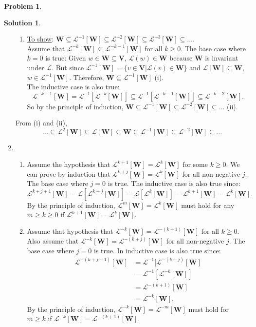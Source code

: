 \documentclass{article}
\theoremstyle{definition}
\newtheorem*{prob*}{Problem}
\newtheorem*{sln*}{Solution}
\newcommand{\V}{\mathbf{V}}
\newcommand{\W}{\mathbf{W}}
\newcommand{\lag}{\mathcal{L}}
\begin{document}
\begin{prob*}
\begin{sln*}
\begin{enumerate}
\begin{enumerate}
				\item \underline{To show}: $\W \subseteq \lag^{-1}[\W] \subseteq \lag^{-2}[\W] \subseteq \lag^{-3}[\W]\subseteq\dots$.\\
				
				Assume that $\lag^{-k}[\W] \subseteq \lag^{-k-1}[\W] $ for all $k\geq 0$. The base case where $k=0$ is true: Given $w\in\W\subseteq \V$, $\lag(w) \in \W$ because $\W$ is invariant under $\lag$. But since $\lag^{-1}[\W] = \{ v\in\V \vert \lag(v)\in \W\}$ and $\lag[\W]\subseteq \W$, $w \in \lag^{-1}[\W]$. Therefore, $\W \subseteq \lag^{-1}[\W]$ (i).\\
				
				The inductive case is also true: $$ \lag^{-k-1}[\W] = \lag^{-1}[\lag^{-k}[\W]] \subseteq \lag^{-1}[\lag^{-k-1}[\W]] \subseteq \lag^{-k-2}[\W].  $$ So by the principle of induction, $\W \subseteq \lag^{-1}[\W] \subseteq \lag^{-2}[\W] \subseteq\dots$ (ii). \\
			\end{enumerate}
				
			From (i) and (ii), $$ \dots  \subseteq \lag^2[\W]\subseteq \lag [\W] \subseteq \W \subseteq \lag^{-1}[\W] \subseteq \lag^{-2}[\W] \subseteq\dots $$
				
				
				
			\item 
			\begin{enumerate}
				\item Assume the hypothesis that $\lag^{k+1}[\W] = \lag^k[\W]$ for some $k\geq 0$. We can prove by induction that $\lag^{k+j}[\W] = \lag^k[\W]$ for all non-negative $j$. The base case where $j=0$ is true. The inductive case is also true since: $$ \lag^{k+j+1}[\W] =  \lag[\lag^{k+j}[\W]] = \lag[\lag^k[\W]] = \lag^{k+1}[\W] = \lag^k[\W]. $$ By the principle of induction, $\lag^{m}[\W] = \lag^k[\W]$ must hold for any $m\geq k\geq 0$ if $\lag^{k+1}[\W] = \lag^k[\W]$.\\
				
				\item Assume that hypothesis that $\lag^{-k}[\W] = \lag^{-(k+1)}[\W]$ for all $k \geq 0$. Also assume that $\lag^{-k}[\W] = \lag^{-(k+j)}[\W]$ for all non-negative $j$. The base case where $j=0$ is true. In inductive case is also true since: 
				 \begin{align*}
				 				 \lag^{-(k+j+1)}[\W] &= \lag^{-1}[\lag^{-(k+j)}[\W]\\ &=  \lag^{-1}[\lag^{-k}[\W]]\\ &= \lag^{-(k+1)}[\W]\\ &= \lag^{-k}[\W].
				 \end{align*}
 				By the principle of induction, $\lag^{-k}[\W] = \lag^{-m}[\W]$ must hold for $m\geq k$ if $\lag^{-k}[\W] = \lag^{-(k+1)}[\W]$.\\
				

\end{enumerate}
\end{enumerate}
\end{sln*}
\end{prob*}
\end{document}
